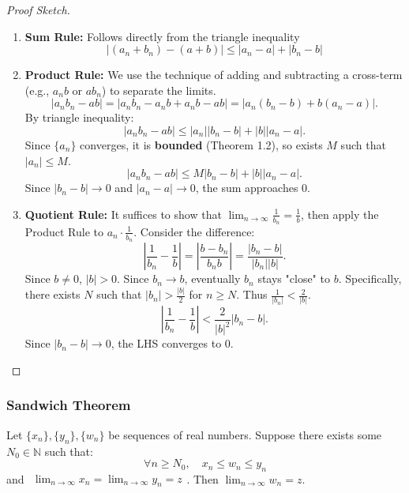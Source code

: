 \documentclass[
	UTF-8,
	11pt, %
	a4paper, %
]{LegrandOrangeBook}
\begin{document}
    \begin{proof}[Proof Sketch]\quad
        \begin{enumerate}
            \item \textbf{Sum Rule:} Follows directly from the triangle inequality 
            $$|(a_n+b_n) - (a+b)| \le |a_n - a| + |b_n - b|$$
            \item \textbf{Product Rule:}
            We use the technique of adding and subtracting a cross-term (e.g., $a_n b$ or $a b_n$) to separate the limits.
            \[
            |a_n b_n - ab| = |a_n b_n - a_n b + a_n b - ab| = |a_n(b_n - b) + b(a_n - a)|.
            \]
            By triangle inequality:
            \[
            |a_n b_n - ab| \le |a_n| |b_n - b| + |b| |a_n - a|.
            \]
            Since $\{a_n\}$ converges, it is \textbf{bounded} (Theorem 1.2), so exists $M$ such that $|a_n| \le M$.
            \[
            |a_n b_n - ab| \le M |b_n - b| + |b| |a_n - a|.
            \]
            Since $|b_n - b| \to 0$ and $|a_n - a| \to 0$, the sum approaches 0.
            \item \textbf{Quotient Rule:}
            It suffices to show that $\lim_{n \to \infty} \frac{1}{b_n} = \frac{1}{b}$, then apply the Product Rule to $a_n \cdot \frac{1}{b_n}$.
            Consider the difference:
            \[
            \left| \frac{1}{b_n} - \frac{1}{b} \right| = \left| \frac{b - b_n}{b_n b} \right| = \frac{|b_n - b|}{|b_n| |b|}.
            \]
            Since $b \neq 0$, $|b| > 0$. Since $b_n \to b$, eventually $b_n$ stays "close" to $b$. Specifically, there exists $N$ such that $|b_n| > \frac{|b|}{2}$ for $n \ge N$. Thus $\frac{1}{|b_n|} < \frac{2}{|b|}$.
            \[
            \left| \frac{1}{b_n} - \frac{1}{b} \right| < \frac{2}{|b|^2} |b_n - b|.
            \]
            Since $|b_n - b| \to 0$, the LHS converges to 0.
        \end{enumerate}
    \end{proof}

    \newpage

    \subsubsection{Sandwich Theorem}

    \begin{theorem}
    Let $\{x_n\}, \{y_n\}, \{w_n\}$ be sequences of real numbers. Suppose there exists some $N_0 \in \mathbb{N}$ such that:
    \[ \forall n \ge N_0, \quad x_n \le w_n \le y_n \]
    and
    $
    \begin{aligned}
            \lim_{n \to \infty} x_n = \lim_{n \to \infty} y_n = z 
    \end{aligned}
    $.
    Then $\displaystyle\lim_{n \to \infty} w_n = z$.
    \end{theorem}
\end{document}
